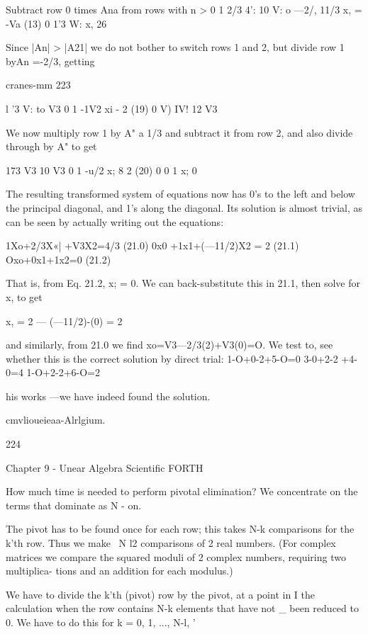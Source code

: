 {Subtract row 0 times Ana from rows with n > 0
1 2/3 4': 10 V:
o —2/, 11/3 x, = -Va (13)
0 1'3 W: x, 26

 

Since |An| > |A21| we do not bother to switch rows 1 and 2, but
divide row 1 byAn =-2/3, getting

cranes-mm 223

l '3 V: to V3
0 1 -1V2 xi - 2 (19)
0 V) IV! 12 V3

 

 

 

 

We now multiply row 1 by A" a 1/3 and subtract it from row 2,
and also divide through by A" to get

173 V3 10 V3
0 1 -u/2 x; 8 2 (20)
0 0 1 x; 0

 

The resulting transformed system of equations now has 0's to the
left and below the principal diagonal, and 1's along the diagonal.
Its solution is almost trivial, as can be seen by actually writing out
the equations:

1Xo+2/3X«| +V3X2=4/3 (21.0)
0x0 +1x1+(—11/2)X2 = 2 (21.1)
Oxo+0x1+1x2=0 (21.2)

That is, from Eq. 21.2, x; = 0. We can back-substitute this in 21.1,
then solve for x, to get

x, = 2 — (—11/2)-(0) = 2

and similarly, from 21.0 we find
xo=V3—2/3(2)+V3(0)=O.
We test to, see whether this is the correct solution by direct trial:
1-O+0-2+5-O=0
3-0+2-2 +4-0=4
1-O+2-2+6-O=2

his works —we have indeed found the solution.

cmvlioueieaa-Alrlgium.

224

Chapter 9 - Unear Algebra Scientific FORTH

How much time is needed to perform pivotal elimination? We
concentrate on the terms that dominate as N - on.

The pivot has to be found once for each row; this takes N-k
comparisons for the k'th row. Thus we make ~N l2 comparisons
of 2 real numbers. (For complex matrices we compare the
squared moduli of 2 complex numbers, requiring two multiplica-
tions and an addition for each modulus.)

We have to divide the k'th (pivot) row by the pivot, at a point in I
the calculation when the row contains N-k elements that have not \_
been reduced to 0. We have to do this for k = 0, 1, ..., N-l, '

}
